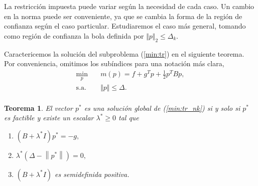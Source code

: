 \documentclass[11pt,a4paper]{book}
\newtheorem{theorem}{Teorema}[chapter]
\theoremstyle{definition}
\theoremstyle{remark}
\newcommand{\norm}[1]{\left\lVert#1\right\rVert}
\begin{document}
La restricción impuesta puede variar según la necesidad de cada caso. Un cambio en
la norma puede ser conveniente, ya que se cambia la forma de la región de confianza
según el caso particular. Estudiaremos el caso más general, tomando como región de confianza
la bola definida por 
$\Vert p \Vert_2 \leq \Delta_k$.

Caractericemos la solución del subproblema (\ref{min:tr}) en el siguiente teorema.
Por conveniencia, omitimos los subíndices para una notación más clara,
\begin{equation}
\label{min:tr_nk}
\begin{aligned}
	\min_{p} \quad & m(p) = f + g^Tp + \frac{1}{2}p^TBp, \\
	\text{s.a.} \quad & \Vert p \Vert \leq \Delta. \\
\end{aligned}
\end{equation}

\begin{theorem} \label{th:trustregion}
	El vector $p^*$ es una solución global de (\ref{min:tr_nk}) si y solo si $p^*$ es factible y existe un escalar $\lambda^* \geq 0$ tal que
\begin{enumerate}
	\item $(B+\lambda^* I)p^*=-g,$
	\item $\lambda^* (\Delta - \norm{p^*}) = 0,$
	\item $(B+\lambda^* I)$ es semidefinida positiva.
\end{enumerate}
\end{theorem}
\end{document}

